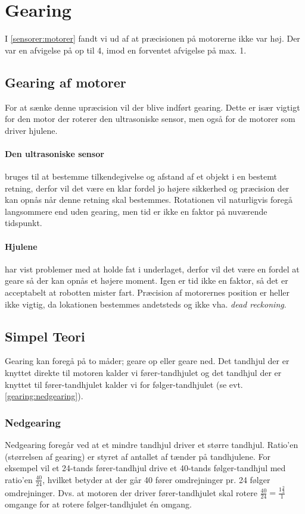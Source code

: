\section{Gearing}\label{robot:gearing}
I \cref{sensorer:motorer} fandt vi ud af at præcisionen på motorerne ikke var høj.
Der var en afvigelse på op til 4\dg, imod en forventet afvigelse på max. 1\dg.

\subsection{Gearing af motorer}
For at sænke denne upræcision vil der blive indført gearing.
Dette er især vigtigt for den motor der roterer den ultrasoniske sensor, men også for de motorer som driver hjulene.

\paragraph{Den ultrasoniske sensor} bruges til at bestemme tilkendegivelse og afstand af et objekt i en bestemt retning, derfor vil det være en klar fordel jo højere sikkerhed og præcision der kan opnås når denne retning skal bestemmes.
Rotationen vil naturligvis foregå langsommere end uden gearing, men tid er ikke en faktor på nuværende tidspunkt.

\paragraph{Hjulene} har vist problemer med at holde fat i underlaget, derfor vil det være en fordel at geare så der kan opnås et højere moment.
Igen er tid ikke en faktor, så det er acceptabelt at robotten mister fart.
Præcision af motorernes position er heller ikke vigtig, da lokationen bestemmes andetsteds og ikke vha. \textit{dead reckoning}.

\subsection{Simpel Teori}\label{gearing:simpel_teori}
Gearing kan foregå på to måder; geare op eller geare ned.
Det tandhjul der er knyttet direkte til motoren kalder vi fører-tandhjulet og det tandhjul der er knyttet til fører-tandhjulet kalder vi for følger-tandhjulet (se evt. \cref{gearing:nedgearing}).

\subsubsection{Nedgearing}
Nedgearing foregår ved at et mindre tandhjul driver et større tandhjul.
Ratio'en (størrelsen af gearing) er styret af antallet af tænder på tandhjulene.
For eksempel vil et 24-tands fører-tandhjul drive et 40-tands følger-tandhjul med ratio'en $\frac{40}{24}$, hvilket betyder at der går 40 fører omdrejninger pr. 24 følger omdrejninger. Dvs. at motoren der driver fører-tandhjulet skal rotere $\frac{40}{24} = \frac{1 \frac{2}{3}}{1}$ omgange for at rotere følger-tandhjulet én omgang.

